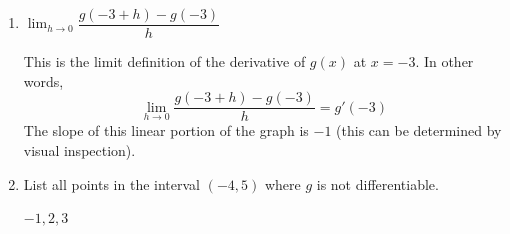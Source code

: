 \documentclass{article}
\begin{document}
\begin{enumerate}
\begin{enumerate}[topsep=0pt]
\begin{solution}
        The slope of this linear portion of the graph is 2 (this can be determined by visual inspection). 
    \end{solution}

  \item
    \begin{problem}[\vfill]
      $\displaystyle \lim_{h \to 0} \dfrac{g(-3 + h) - g(-3)}{h}$
    \end{problem}

    \begin{solution}
        This is the limit definition of the derivative of $g(x)$ at $x=-3$. In other words, 
        $$\displaystyle \lim_{h \to 0} \dfrac{g(-3 + h) - g(-3)}{h}=g'(-3)$$
        The slope of this linear portion of the graph is $-1$ (this can be determined by visual inspection). 
    \end{solution}

  \item 
    \begin{problem}
      List all points in the interval $(-4, 5)$ where $g$ is not differentiable.
    \end{problem}

    \begin{solution} 
      $-1, 2, 3$ 
    \end{solution} 

  \end{enumerate}

\end{enumerate}
\end{document}
